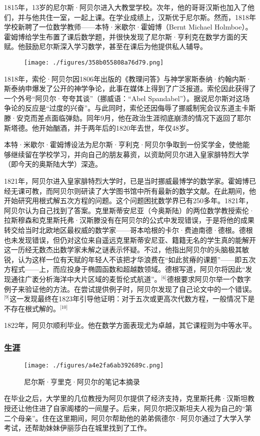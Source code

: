 1815年，13岁的尼尔斯·阿贝尔进入大教堂学校。次年，他的哥哥汉斯也加入了他们，并与他共住一室，一起上课。在学业成绩上，汉斯优于尼尔斯。然而，1818年学校新聘了一位数学教师——本特·米歇尔·霍姆博（Bernt Michael Holmboe）。霍姆博给学生布置了课后数学题，并很快发现了尼尔斯·亨利克在数学方面的天赋。他鼓励尼尔斯深入学习数学，甚至在课后为他提供私人辅导。
\begin{figure}[ht]
\centering
\texttt{[image: ./figures/358b055808a76d79.png]}
\caption{} \label{fig_NRSAB_1}
\end{figure}
1818年，索伦·阿贝尔因1806年出版的《教理问答》与神学家斯泰纳·约翰内斯·斯泰纳申爆发了公开的神学争论，此事在媒体上得到了广泛报道。索伦因此获得了一个外号“阿贝尔·夸夸其谈”（挪威语：“Abel Spandabel”）。据说尼尔斯对这场争论的反应是“过度的兴奋”。与此同时，索伦还因侮辱了挪威制宪会议东道主卡斯滕·安克而差点面临弹劾。同年9月，他在政治生涯彻底崩溃的情况下返回了耶尔斯塔德。他开始酗酒，并于两年后的1820年去世，年仅48岁。

本特·米歇尔·霍姆博设法为尼尔斯·亨利克·阿贝尔争取到一份奖学金，使他能够继续留在学校学习，并向自己的朋友募资，以资助阿贝尔进入皇家腓特烈大学（即今天的奥斯陆大学）深造。

1821年，阿贝尔进入皇家腓特烈大学时，已是当时挪威最博学的数学家。霍姆博已经无课可教，而阿贝尔则研读了大学图书馆中所有最新的数学文献。在此期间，他开始研究用根式解五次方程的问题。这个问题困扰数学界已有250多年。1821年，阿贝尔认为自己找到了答案。克里斯蒂安尼亚（今奥斯陆）的两位数学教授索伦·拉斯穆森和克里斯托弗·汉斯滕没有在阿贝尔的公式中发现错误，于是将他的成果转交给当时北欧地区最权威的数学家——哥本哈根的卡尔·费迪南德·德根。德根也未发现错误，但仍对这位来自遥远克里斯蒂安尼亚、籍籍无名的学生真的能解开这一历经无数杰出数学家未解之谜表示怀疑。不过，他指出阿贝尔的头脑极其敏锐，认为这样一位有天赋的年轻人不该把才华浪费在“如此贫瘠的课题”——即五次方程式——上，而应投身于椭圆函数和超越数领域。德根写道，阿贝尔将因此“发现通往广袤分析海洋中大片区域的麦哲伦式航道”。\(^\text{[6]}\)德根要求阿贝尔举一个数字例子来验证他的方法。在尝试提供例子时，阿贝尔发现了自己论文中的一个错误。\(^\text{[9]}\)这一发现最终在1823年引导他证明：对于五次或更高次代数方程，一般情况下是不存在根式解的。\(^\text{[10]}\)

1822年，阿贝尔顺利毕业。他在数学方面表现尤为卓越，其它课程则为中等水平。
\subsubsection{生涯}
\begin{figure}[ht]
\centering
\texttt{[image: ./figures/a4e2fa6ab392689c.png]}
\caption{尼尔斯·亨里克·阿贝尔的笔记本摘录} \label{fig_NRSAB_2}
\end{figure}
在毕业之后，大学里的几位教授为阿贝尔提供了经济支持，克里斯托弗·汉斯坦教授还让他住进了自家阁楼的一间屋子。后来，阿贝尔把汉斯坦夫人视为自己的“第二个母亲”。住在这里期间，阿贝尔帮助他的弟弟佩德尔·阿贝尔通过了大学入学考试，还帮助妹妹伊丽莎白在城里找到了工作。


